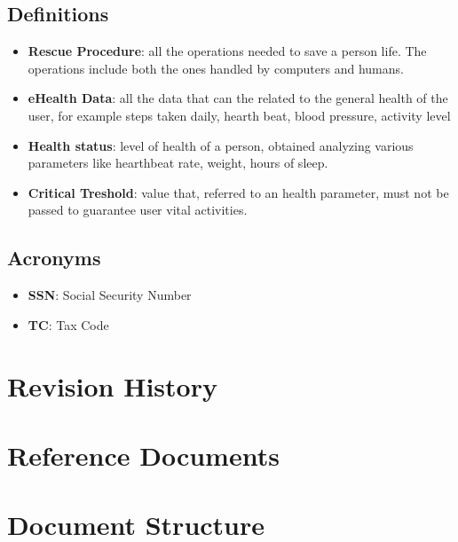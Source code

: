 \subsection{Definitions}
\begin{itemize}
\item \textbf{Rescue Procedure}: all the operations needed to save a person life. The operations include both the ones handled by computers and humans.
\item \textbf{eHealth Data}: all the data that can the related to the general health of the user, for example steps taken daily, hearth beat, blood pressure, activity level
\item \textbf{Health status}: level of health of a person, obtained analyzing various parameters like  hearthbeat rate, weight, hours of sleep.
\item \textbf{Critical Treshold}: value that, referred to an health parameter, must not be passed to guarantee user vital activities.
\end{itemize}




\subsection{Acronyms}

\begin{itemize}
\item \textbf{SSN}: Social Security Number
\item \textbf{TC}: Tax Code
\end{itemize}




\section{Revision History}
\section{Reference Documents}
\section{Document Structure}